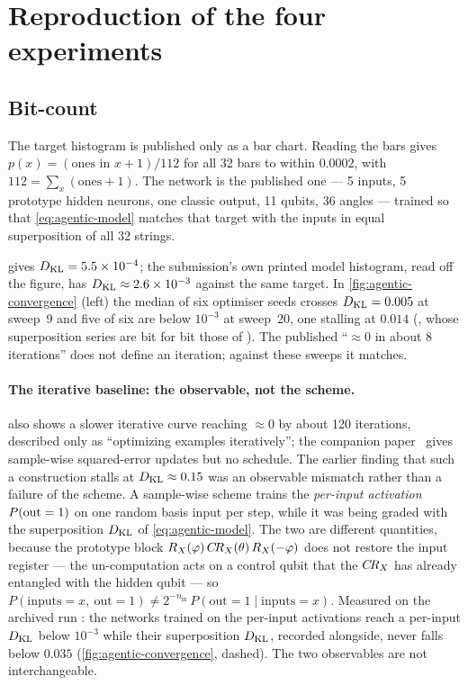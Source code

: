 \section{Reproduction of the four experiments}
\label{app:repro}

\subsection{Bit-count}
\label{app:bitcount}

The target histogram is published only as a bar chart.  Reading the bars gives
$p(x)=(\text{ones in }x+1)/112$ for all 32 bars to within $0.0002$, with
$112=\sum_x(\text{ones}+1)$.  The network is the published one --- 5 inputs, 5 prototype hidden
neurons, one classic output, 11 qubits, 36 angles --- trained so that \cref{eq:agentic-model}
matches that target with the inputs in equal superposition of all 32 strings.

 gives $D_{\mathrm{KL}}=5.5\times10^{-4}$; the submission's own printed model
histogram, read off the figure, has $D_{\mathrm{KL}}\approx2.6\times10^{-3}$ against the same target.  In
\cref{fig:agentic-convergence} (left) the median of six optimiser seeds crosses $D_{\mathrm{KL}}=0.005$ at
sweep~9 and five of six are below $10^{-3}$ at sweep~20, one stalling at $0.014$
(, whose superposition series are bit for bit those of
).  The
published ``$\approx0$ in about 8 iterations'' does not define an iteration; against these
sweeps it matches.

\paragraph{The iterative baseline: the observable, not the scheme.}
 also shows a slower iterative curve reaching $\approx0$ by about 120
iterations, described only as ``optimizing examples iteratively''; the companion
paper~\cite{rosenhahn2026stochasticneuralnetworksquantum} gives sample-wise squared-error
updates but no schedule.  The earlier finding that such a construction stalls at
$D_{\mathrm{KL}}\approx0.15$ was an observable mismatch rather than a failure of the scheme.  A sample-wise
scheme trains the \emph{per-input activation} $P(\mathrm{out}=1)$ on one random basis input per step, while
it was being graded with the superposition $D_{\mathrm{KL}}$ of \cref{eq:agentic-model}.  The two are
different quantities, because the prototype block $R_X(\varphi)\,C\!R_X(\theta)\,R_X(-\varphi)$
does not restore the input register --- the un-computation acts on a control qubit that the
$C\!R_X$ has already entangled with the hidden qubit --- so
$P(\text{inputs}=x,\ \mathrm{out}=1)\neq
2^{-n_{\mathrm{in}}}\,P(\mathrm{out}=1\mid\text{inputs}=x)$.  Measured on the archived run
: the networks trained on the per-input activations reach a
per-input $D_{\mathrm{KL}}$ below $10^{-3}$ while their superposition $D_{\mathrm{KL}}$, recorded alongside, never falls
below $0.035$ (\cref{fig:agentic-convergence}, dashed).  The two observables are not
interchangeable.

